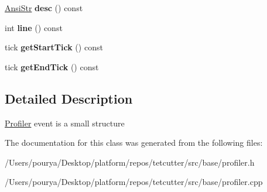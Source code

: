 \begin{DoxyCompactItemize}
\item 
\hypertarget{classps_1_1utils_1_1ProfileEvent_a604c7cec53717fcafae315deeefe0ef6}{}\hyperlink{classps_1_1base_1_1CAString}{Ansi\+Str} {\bfseries desc} () const \label{classps_1_1utils_1_1ProfileEvent_a604c7cec53717fcafae315deeefe0ef6}

\item 
\hypertarget{classps_1_1utils_1_1ProfileEvent_ad2aaf4685841e5f857355b8339301ba1}{}int {\bfseries line} () const \label{classps_1_1utils_1_1ProfileEvent_ad2aaf4685841e5f857355b8339301ba1}

\item 
\hypertarget{classps_1_1utils_1_1ProfileEvent_a77aa32dead36d8e6fa1e8cff606a426c}{}tick {\bfseries get\+Start\+Tick} () const \label{classps_1_1utils_1_1ProfileEvent_a77aa32dead36d8e6fa1e8cff606a426c}

\item 
\hypertarget{classps_1_1utils_1_1ProfileEvent_acf2ec504c4d31fcb70eca67d2bdc5c63}{}tick {\bfseries get\+End\+Tick} () const \label{classps_1_1utils_1_1ProfileEvent_acf2ec504c4d31fcb70eca67d2bdc5c63}

\end{DoxyCompactItemize}


\subsection{Detailed Description}
\hyperlink{classps_1_1utils_1_1Profiler}{Profiler} event is a small structure 

The documentation for this class was generated from the following files\+:\begin{DoxyCompactItemize}
\item 
/\+Users/pourya/\+Desktop/platform/repos/tetcutter/src/base/profiler.\+h\item 
/\+Users/pourya/\+Desktop/platform/repos/tetcutter/src/base/profiler.\+cpp\end{DoxyCompactItemize}
